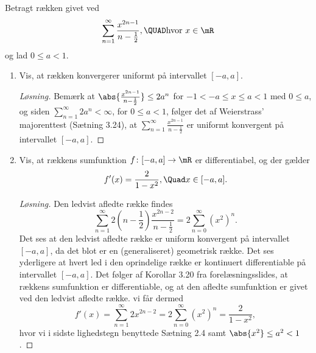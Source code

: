 \begin{opg}
	Betragt rækken givet ved
	$$ \sum_{n=1}^\infty \frac{x^{2n-1}}{n-\frac12}, \QUAD\text{hvor } x\in\mR $$
	og lad $0\leq a < 1$. 
	\begin{enumerate}
		\item Vis, at rækken konvergerer uniformt på intervallet $[-a,a]$.
		\ifanswers
		\begin{proof}[Løsning]
			Bemærk at $ \abs{\frac{x^{2n-1}}{n-\frac{1}{2}}}\leq 2a^n $ for $ -1<-a\leq x\leq a<1 $ med $ 0\leq a $, og siden $ \sum_{n=1}^{\infty}2a^n<\infty $, for $ 0\leq a<1 $, følger det af Weierstrass' majorenttest (Sætning 3.24), at $ \sum_{n=1}^\infty \frac{x^{2n-1}}{n-\frac12} $ er uniformt konvergent på intervallet $ [-a,a] $.
		\end{proof}
		\fi
		
		\item Vis, at rækkens sumfunktion $f\colon [-a,a]\to\mR$ er differentiabel, og der gælder
		$$ f'(x)=\frac{2}{1-x^2}, \Quad x\in[-a,a]. $$
		\ifanswers
		\begin{proof}[Løsning]
			Den ledvist afledte række findes\begin{equation*}
			\sum_{n=1}^{\infty}2\left(n-\frac{1}{2}\right)\frac{x^{2n-2}}{n-\frac12}=2\sum_{n=0}^{\infty}(x^2)^n.
			\end{equation*}
			Det ses at den ledvist afledte række er uniform konvergent på intervallet $ [-a,a] $, da det blot er en (generaliseret) geometrisk række. Det ses yderligere at hvert led i den oprindelige række er kontinuert differentiable på intervallet $ [-a,a] $.
			Det følger af Korollar 3.20 fra forelæsningsslides, at rækkens sumfunktion er differentiable, og at den afledte sumfunktion er givet ved den ledvist afledte række. vi får dermed \begin{equation*}
			f'(x)=\sum_{n=1}^{\infty}2x^{2n-2}=2\sum_{n=0}^{\infty}(x^2)^n=\frac{2}{1-x^2},
			\end{equation*}
			hvor vi i sidste lighedstegn benyttede Sætning 2.4 samt $ \abs{x^2}\leq a^2<1 $.
		\end{proof}
		\fi
		

\end{enumerate}
\end{opg}
